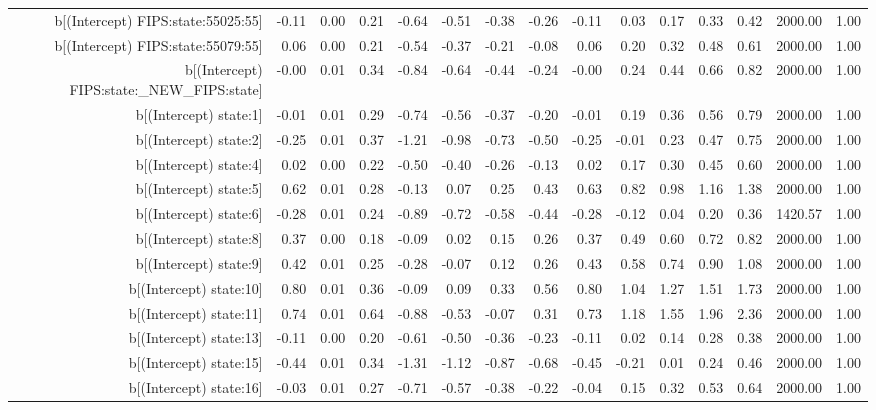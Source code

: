 \begin{table}[ht]
\begin{tabular}{rrrrrrrrrrrrrrr}
  b[(Intercept) FIPS:state:55025:55] & -0.11 & 0.00 & 0.21 & -0.64 & -0.51 & -0.38 & -0.26 & -0.11 & 0.03 & 0.17 & 0.33 & 0.42 & 2000.00 & 1.00 \\ 
  b[(Intercept) FIPS:state:55079:55] & 0.06 & 0.00 & 0.21 & -0.54 & -0.37 & -0.21 & -0.08 & 0.06 & 0.20 & 0.32 & 0.48 & 0.61 & 2000.00 & 1.00 \\ 
  b[(Intercept) FIPS:state:\_NEW\_FIPS:state] & -0.00 & 0.01 & 0.34 & -0.84 & -0.64 & -0.44 & -0.24 & -0.00 & 0.24 & 0.44 & 0.66 & 0.82 & 2000.00 & 1.00 \\ 
  b[(Intercept) state:1] & -0.01 & 0.01 & 0.29 & -0.74 & -0.56 & -0.37 & -0.20 & -0.01 & 0.19 & 0.36 & 0.56 & 0.79 & 2000.00 & 1.00 \\ 
  b[(Intercept) state:2] & -0.25 & 0.01 & 0.37 & -1.21 & -0.98 & -0.73 & -0.50 & -0.25 & -0.01 & 0.23 & 0.47 & 0.75 & 2000.00 & 1.00 \\ 
  b[(Intercept) state:4] & 0.02 & 0.00 & 0.22 & -0.50 & -0.40 & -0.26 & -0.13 & 0.02 & 0.17 & 0.30 & 0.45 & 0.60 & 2000.00 & 1.00 \\ 
  b[(Intercept) state:5] & 0.62 & 0.01 & 0.28 & -0.13 & 0.07 & 0.25 & 0.43 & 0.63 & 0.82 & 0.98 & 1.16 & 1.38 & 2000.00 & 1.00 \\ 
  b[(Intercept) state:6] & -0.28 & 0.01 & 0.24 & -0.89 & -0.72 & -0.58 & -0.44 & -0.28 & -0.12 & 0.04 & 0.20 & 0.36 & 1420.57 & 1.00 \\ 
  b[(Intercept) state:8] & 0.37 & 0.00 & 0.18 & -0.09 & 0.02 & 0.15 & 0.26 & 0.37 & 0.49 & 0.60 & 0.72 & 0.82 & 2000.00 & 1.00 \\ 
  b[(Intercept) state:9] & 0.42 & 0.01 & 0.25 & -0.28 & -0.07 & 0.12 & 0.26 & 0.43 & 0.58 & 0.74 & 0.90 & 1.08 & 2000.00 & 1.00 \\ 
  b[(Intercept) state:10] & 0.80 & 0.01 & 0.36 & -0.09 & 0.09 & 0.33 & 0.56 & 0.80 & 1.04 & 1.27 & 1.51 & 1.73 & 2000.00 & 1.00 \\ 
  b[(Intercept) state:11] & 0.74 & 0.01 & 0.64 & -0.88 & -0.53 & -0.07 & 0.31 & 0.73 & 1.18 & 1.55 & 1.96 & 2.36 & 2000.00 & 1.00 \\ 
  b[(Intercept) state:13] & -0.11 & 0.00 & 0.20 & -0.61 & -0.50 & -0.36 & -0.23 & -0.11 & 0.02 & 0.14 & 0.28 & 0.38 & 2000.00 & 1.00 \\ 
  b[(Intercept) state:15] & -0.44 & 0.01 & 0.34 & -1.31 & -1.12 & -0.87 & -0.68 & -0.45 & -0.21 & 0.01 & 0.24 & 0.46 & 2000.00 & 1.00 \\ 
  b[(Intercept) state:16] & -0.03 & 0.01 & 0.27 & -0.71 & -0.57 & -0.38 & -0.22 & -0.04 & 0.15 & 0.32 & 0.53 & 0.64 & 2000.00 & 1.00 \\ 

\end{tabular}
\end{table}
